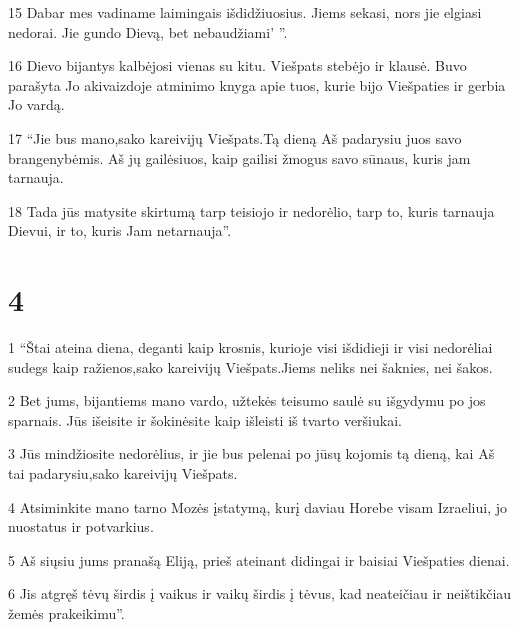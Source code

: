 \par 15 Dabar mes vadiname laimingais išdidžiuosius. Jiems sekasi, nors jie elgiasi nedorai. Jie gundo Dievą, bet nebaudžiami’ ”. 
\par 16 Dievo bijantys kalbėjosi vienas su kitu. Viešpats stebėjo ir klausė. Buvo parašyta Jo akivaizdoje atminimo knyga apie tuos, kurie bijo Viešpaties ir gerbia Jo vardą. 
\par 17 “Jie bus mano,­sako kareivijų Viešpats.­Tą dieną Aš padarysiu juos savo brangenybėmis. Aš jų gailėsiuos, kaip gailisi žmogus savo sūnaus, kuris jam tarnauja. 
\par 18 Tada jūs matysite skirtumą tarp teisiojo ir nedorėlio, tarp to, kuris tarnauja Dievui, ir to, kuris Jam netarnauja”.



\chapter{4}


\par 1 “Štai ateina diena, deganti kaip krosnis, kurioje visi išdidieji ir visi nedorėliai sudegs kaip ražienos,­sako kareivijų Viešpats.­Jiems neliks nei šaknies, nei šakos. 
\par 2 Bet jums, bijantiems mano vardo, užtekės teisumo saulė su išgydymu po jos sparnais. Jūs išeisite ir šokinėsite kaip išleisti iš tvarto veršiukai. 
\par 3 Jūs mindžiosite nedorėlius, ir jie bus pelenai po jūsų kojomis tą dieną, kai Aš tai padarysiu,­sako kareivijų Viešpats.­ 
\par 4 Atsiminkite mano tarno Mozės įstatymą, kurį daviau Horebe visam Izraeliui, jo nuostatus ir potvarkius. 
\par 5 Aš siųsiu jums pranašą Eliją, prieš ateinant didingai ir baisiai Viešpaties dienai. 
\par 6 Jis atgręš tėvų širdis į vaikus ir vaikų širdis į tėvus, kad neateičiau ir neištikčiau žemės prakeikimu”.



